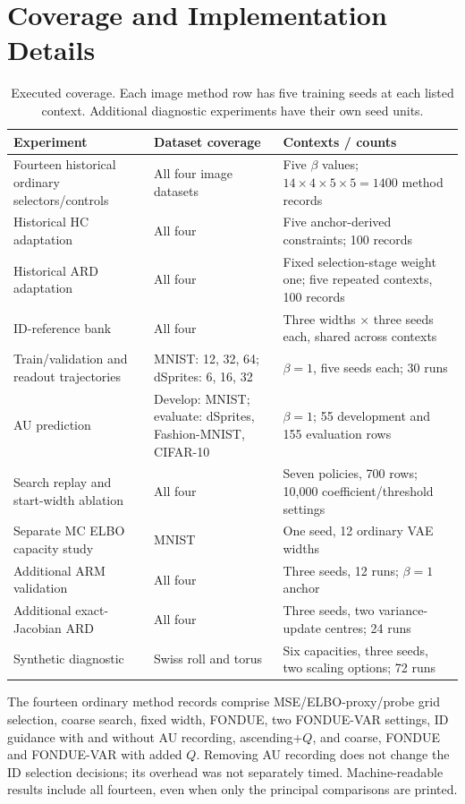 \section{Coverage and Implementation Details}\label{app:coverage}
\begin{table}[H]
\caption{Executed coverage. Each image method row has five training
seeds at each listed context. Additional diagnostic experiments have
their own seed units.}
\label{tab:coverage}\small
\begin{tabularx}{\textwidth}{>{\raggedright\arraybackslash}p{}>{\raggedright\arraybackslash}p{}>{\raggedright\arraybackslash}X}\toprule
Experiment & Dataset coverage & Contexts / counts \\\midrule
Fourteen historical ordinary selectors/controls & All four image datasets & Five $\beta$ values; $14\times4\times5\times5=1400$ method records \\
Historical HC adaptation & All four & Five anchor-derived constraints; 100 records \\
Historical ARD adaptation & All four & Fixed selection-stage weight one; five repeated contexts, 100 records \\
ID-reference bank & All four & Three widths $\times$ three seeds each, shared across contexts \\
Train/validation and readout trajectories & MNIST: 12, 32, 64; dSprites: 6, 16, 32 & $\beta=1$, five seeds each; 30 runs \\
AU prediction & Develop: MNIST; evaluate: dSprites, Fashion-MNIST, CIFAR-10 & $\beta=1$; 55 development and 155 evaluation rows \\
Search replay and start-width ablation & All four & Seven policies, 700 rows; 10,000 coefficient/threshold settings \\
Separate MC ELBO capacity study & MNIST & One seed, 12 ordinary VAE widths \\
Additional ARM validation & All four & Three seeds, 12 runs; $\beta=1$ anchor \\
Additional exact-Jacobian ARD & All four & Three seeds, two variance-update centres; 24 runs \\
Synthetic diagnostic & Swiss roll and torus & Six capacities, three seeds, two scaling options; 72 runs \\
\bottomrule\end{tabularx}
\end{table}

The fourteen ordinary method records comprise MSE/ELBO-proxy/probe grid
selection, coarse search, fixed width, FONDUE, two FONDUE-VAR settings,
ID guidance with and without AU recording, ascending+$Q$, and coarse,
FONDUE and FONDUE-VAR with added $Q$. Removing AU recording does not
change the ID selection decisions; its overhead was not separately
timed. Machine-readable results include all fourteen, even when only
the principal comparisons are printed.

